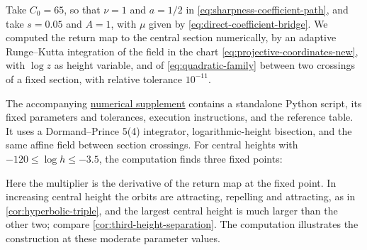 \begin{remark}
\label{rem:numerical-three-cycles}
Take \(C_0=65\), so that \(\nu=1\) and \(a=1/2\) in
\eqref{eq:sharpness-coefficient-path}, and take \(s=0.05\) and \(A=1\),
with \(\mu\) given by \eqref{eq:direct-coefficient-bridge}. We computed the
return map to the central section numerically, by an adaptive Runge--Kutta
integration of the field in the chart \eqref{eq:projective-coordinates-new},
with \(\log z\) as height variable, and of \eqref{eq:quadratic-family}
between two crossings of a fixed section, with relative tolerance
\(10^{-11}\).

The accompanying
\href{https://github.com/h-lu/I21-reproof/raw/ccbc54f203ef41d891f4e2c890b595955c58b244/supplementary/three-cycles.zip}{numerical supplement}
contains a standalone Python script, its fixed parameters and tolerances,
execution instructions, and the reference table. It uses a Dormand--Prince
5(4) integrator, logarithmic-height bisection, and the same affine field
between section crossings. For central heights with
\(-120\le\log h\le-3.5\), the computation finds three fixed points:
\begin{center}

\end{center}
Here the multiplier is the derivative of the return map at the fixed point.
In increasing central height the orbits are attracting, repelling and
attracting, as in \cref{cor:hyperbolic-triple}, and the largest central
height is much larger than the other two; compare
\cref{cor:third-height-separation}. The computation illustrates the
construction at these moderate parameter values.
\end{remark}
